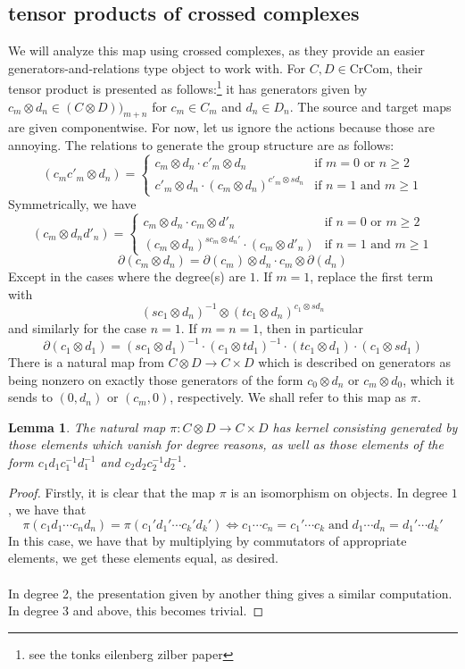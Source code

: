 \documentclass[12pt]{article}
\newtheorem{lemma}[theorem]{Lemma}
\theoremstyle{definition}
\newcommand{\crcom}{\text{CrCom}}
\newcommand{\del}{\partial}
\begin{document}
\subsection{tensor products of crossed complexes}		
	We will analyze this map using crossed complexes, as they provide an easier generators-and-relations type object to work with. 
For $C,D \in \crcom$, their tensor product is presented as follows:\footnote{see the tonks eilenberg zilber paper} 
it has generators given by $c_m \otimes d_n \in (C \otimes D))_{m+n}$ for $c_m \in C_m$	and $d_n \in D_n$. The source and target maps are given componentwise. 
For now, let us ignore the actions because those are annoying. 
The relations to generate the group structure are as follows:
$$
(c_mc'_m \otimes d_n) = 
\begin{cases}
	c_m \otimes d_n \cdot c'_m\otimes d_n & \text{if }m = 0 \text{ or } n \ge 2 \\
	c'_m \otimes d_n \cdot (c_m \otimes d_n)^{c'_m \otimes sd_n} & \text{if } n = 1 \text{ and } m \ge 1
\end{cases}
$$
Symmetrically, we have
$$
(c_m \otimes d_nd'_n) = 
\begin{cases}
	c_m \otimes d_n \cdot c_m\otimes d'_n & \text{if } n = 0 \text{ or } m \ge 2 \\
	(c_m \otimes d_n)^{sc_m \otimes d_n'} \cdot (c_m \otimes d'_n) & \text{if } n = 1 \text{ and } m \ge 1
\end{cases}
$$
$$\del (c_m \otimes d_n) = \del(c_m) \otimes d_n \cdot c_m \otimes \del(d_n)$$
Except in the cases where the degree(s) are $1$. If $m = 1$, replace the first term with
$$(sc_1 \otimes d_n)^{-1} \otimes (tc_1 \otimes d_n)^{c_1 \otimes sd_n}$$
and similarly for the case $n = 1$.
If $m = n = 1$, then in particular 
$$\del(c_1 \otimes d_1) = (sc_1 \otimes d_1)^{-1} \cdot (c_1 \otimes td_1)^{-1} \cdot (tc_1 \otimes d_1) \cdot (c_1 \otimes sd_1) $$
There is a natural map from $C \otimes D \to C \times D$ which is described on generators as being nonzero on exactly those generators of the form $c_0 \otimes d_n$ or $c_m \otimes d_0$, which it sends to $(0, d_n)$ or $(c_m, 0)$, respectively. We shall refer to this map as $\pi$.
\begin{lemma}
 	The natural map $\pi: C \otimes D \to C \times D$ has kernel consisting generated by those elements which vanish for degree reasons, as well as those elements of the form $c_1 d_1 c_1^{-1}d_1^{-1}$ and $c_2d_2c_2^{-1}d_2^{-1}$.
\end{lemma}
\begin{proof}
	Firstly, it is clear that the map $\pi$ is an isomorphism on objects. In degree $1$, we have that 
	$$\pi(c_1d_1 \cdots c_nd_n) = \pi(c_1'd_1' \cdots c_k'd_k') \iff c_1\cdots c_n = c_1' \cdots c_k \; \text{and}\; d_1 \cdots d_n = d_1' \cdots d_k'$$
	In this case, we have that by multiplying by commutators of appropriate elements, we get these elements equal, as desired.
	\\\\
	In degree 2, the presentation given by another thing gives a similar computation.
	In degree 3 and above, this becomes trivial.
\end{proof}
\end{document}
